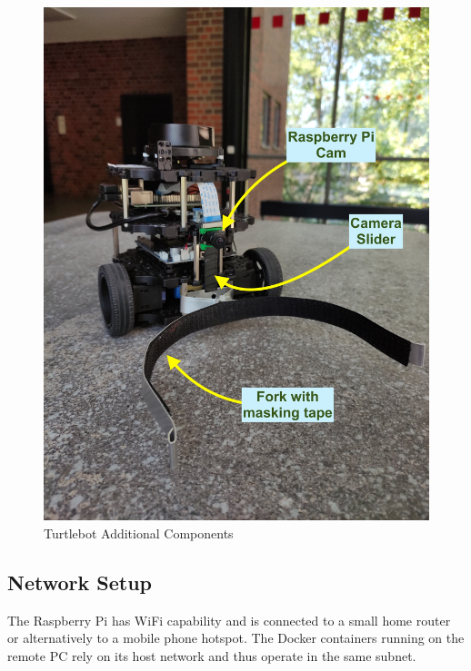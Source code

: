 \begin{figure}[!ht]
\centering
\includegraphics[width=\linewidth]{images/turtlebot-setup/ball-schubser_front_side_new_desc.jpg}
\caption{Turtlebot Additional Components}
\label{fig:turtlebot-add-components}
\end{figure}

\subsection{Network Setup}

The Raspberry Pi has WiFi capability and is connected to a small home router or alternatively to a mobile phone hotspot. The Docker containers running on the remote PC rely on its host network and thus operate in the same subnet.

